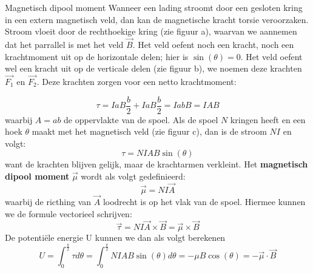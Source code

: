 \begin{theo}{Magnetisch dipool moment}
    Wanneer een lading stroomt door een gesloten kring in een extern magnetisch veld, dan kan de magnetische kracht torsie veroorzaken.
    Stroom vloeit door de rechthoekige kring (zie figuur a), waarvan we aannemen dat het parrallel is met het veld $\Vec{B}$.
    Het veld oefent noch een kracht, noch een krachtmoment uit op de horizontale delen; hier is $\sin(\theta) = 0$. Het veld oefent wel een kracht uit op de verticale delen
    (zie figuur b), we noemen deze krachten $\Vec{F_1}$ en $\Vec{F_2}$. Deze krachten zorgen voor een netto krachtmoment:


    \hspace{-0.5cm}\begin{minipage}{0.79\textwidth}
        \begin{equation*}
            \tau = IaB\dfrac{b}{2} + IaB\dfrac{b}{2} = IabB = IAB
        \end{equation*}
        waarbij $A = ab$ de oppervlakte van de spoel.
        Als de spoel $N$ kringen heeft en een hoek $\theta$ maakt met het magnetisch veld (zie figuur c),
        dan is de stroom $NI$ en volgt:
        \begin{equation*}
            \tau = NIAB\sin(\theta)
        \end{equation*}
        want de krachten blijven gelijk, maar de krachtarmen verkleint.
        Het \textbf{magnetisch dipool moment} $\Vec{\mu}$ wordt als volgt gedefinieerd:
        \begin{equation*}
            \Vec{\mu} = NI\Vec{A}
        \end{equation*}
        waarbij de ricthing van $\Vec{A}$ loodrecht is op het vlak van de spoel. Hiermee kunnen we de formule vectorieel schrijven:
        \begin{equation*}
            \Vec{\tau} = NI\Vec{A} \times \Vec{B} = \Vec{\mu} \times \Vec{B}
        \end{equation*}
        De potentiële energie U kunnen we dan als volgt berekenen
        \begin{equation*}
            U = \int_0^{\tfrac{\pi}{2}} \tau d\theta = \int_0^{\tfrac{\pi}{2}} NIAB\sin(\theta) d\theta = -\mu B\cos(\theta) = -\Vec{\mu} \cdot \Vec{B}
        \end{equation*}
    \end{minipage}
    \begin{minipage}{.17\textwidth}

\end{minipage}
\end{theo}
